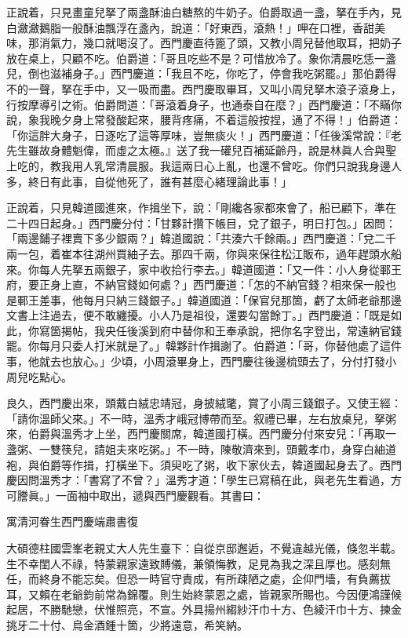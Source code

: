 正說着，只見畫童兒拏了兩盞酥油白糖熬的牛奶子。伯爵取過一盞，拏在手內，見白瀲瀲鵝脂一般酥油飄浮在盞內，說道：「好東西，滾熱！」呷在口裡，香甜美味，那消氣力，幾口就喝沒了。西門慶直待篦了頭，又教小周兒替他取耳，把奶子放在桌上，只顧不吃。伯爵道：「哥且吃些不是？可惜放冷了。象你清晨吃恁一盞兒，倒也滋補身子。」西門慶道：「我且不吃，你吃了，停會我吃粥罷。」那伯爵得不的一聲，拏在手中，又一吸而盡。{}西門慶取畢耳，又叫小周兒拏木滾子滾身上，行按摩導引之術。伯爵問道：「哥滾着身子，也通泰自在麼？」西門慶道：「不瞞你說，象我晚夕身上常發酸起來，腰背疼痛，不着這般按捏，通了不得！」伯爵道：「你這胖大身子，日逐吃了這等厚味，豈無痰火！」西門慶道：「任後溪常說：『老先生雖故身體魁偉，而虛之太極。』送了我一礶兒百補延齡丹，說是林眞人合與聖上吃的，教我用人乳常清晨服。我這兩日心上亂，也還不曾吃。你們只說我身邊人多，終日有此事，自從他死了，誰有甚麼心緒理論此事！」{}

正說着，只見韓道國進來，作揖坐下，說：「剛纔各家都來會了，船已顧下，準在二十四日起身。」西門慶分付：「甘夥計攢下帳目，兌了銀子，明日打包。」因問：「兩邊鋪子裡賣下多少銀兩？」韓道國說：「共湊六千餘兩。」西門慶道：「兌二千兩一包，着崔本往湖州買紬子去。那四千兩，你與來保往松江販布，過年趕頭水船來。你每人先拏五兩銀子，家中收拾行李去。」韓道國道：「又一件：小人身從鄆王府，要正身上直，不納官錢如何處？」西門慶道：「怎的不納官錢？相來保一般也是鄆王差事，他每月只納三錢銀子。」韓道國道：「保官兒那箇，虧了太師老爺那邊文書上注過去，便不敢纏擾。小人乃是祖役，還要勾當餘丁。」西門慶道：「既是如此，你寫箇揭帖，我央任後溪到府中替你和王奉承說，把你名字登出，常遠納官錢罷。你每月只委人打米就是了。」韓夥計作揖謝了。伯爵道：「哥，你替他處了這件事，他就去也放心。」少頃，小周滾畢身上，西門慶往後邊梳頭去了，分付打發小周兒吃點心。

良久，西門慶出來，頭戴白絨忠靖冠，身披絨氅，賞了小周三錢銀子。又使王經：「請你溫師父來。」不一時，溫秀才峨冠博帶而至。叙禮已畢，左右放桌兒，拏粥來，伯爵與溫秀才上坐，西門慶關席，韓道國打橫。西門慶分付來安兒：「再取一盞粥、一雙筷兒，請姐夫來吃粥。」不一時，陳敬濟來到，頭戴孝巾，身穿白紬道袍，與伯爵等作揖，打橫坐下。須臾吃了粥，收下家伙去，韓道國起身去了。西門慶因問溫秀才：「書寫了不曾？」溫秀才道：「學生已寫稿在此，與老先生看過，方可謄眞。」一面袖中取出，遞與西門慶觀看。其書曰：

\begin{myquote}[\markfont]
寓清河眷生西門慶端肅書復

大碩德柱國雲峯老親丈大人先生臺下：自從京邸邂逅，不覺違越光儀，倏忽半載。生不幸閨人不祿，特蒙親家遠致賻儀，兼領悔教，足見為我之深且厚也。感刻無任，而終身不能忘矣。但恐一時官守責成，有所疎陋之處，企仰門墻，有負薦拔耳，又賴在老爺鈞前常為錦覆。則生始終蒙恩之處，皆親家所賜也。今因便鴻謹候起居，不勝馳戀，伏惟照亮，不宣。外具揚州縐紗汗巾十方、色綾汗巾十方、揀金挑牙二十付、烏金酒鍾十箇，少將遠意，希笑納。
\end{myquote}

